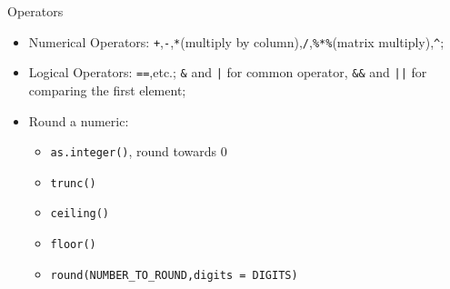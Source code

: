 \begin{point}
    Operators
\end{point}
\begin{itemize}[topsep=2pt,itemsep=0pt]
    \item Numerical Operators: \lstinline|+|,\lstinline|-|,\lstinline|*|(multiply by column),\lstinline|/|,\lstinline|%*%|(matrix multiply),\lstinline|^|;
    \item Logical Operators: \lstinline|==|,etc.; \lstinline|&| and \lstinline{|} for common operator, \lstinline|&&| and \lstinline{||} for comparing the first element;
    \item Round a numeric:
    \begin{itemize}[topsep=2pt,itemsep=0pt]
        \item \lstinline|as.integer()|, round towards 0
        \item \lstinline|trunc()|
        \item \lstinline|ceiling()|
        \item \lstinline|floor()|
        \item \lstinline|round(NUMBER_TO_ROUND,digits = DIGITS)|
    \end{itemize}
    
        
\end{itemize}


